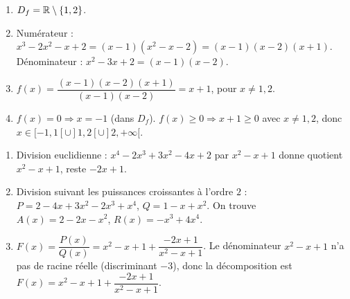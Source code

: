 \begin{enumerate}[label=\arabic*)]
    \item $D_f = \mathbb{R} \setminus \{1, 2\}$.
    \item Numérateur : $x^3 - 2x^2 - x + 2 = (x-1)(x^2 - x - 2) = (x-1)(x-2)(x+1)$. Dénominateur : $x^2 - 3x + 2 = (x-1)(x-2)$.
    \item $f(x) = \dfrac{(x-1)(x-2)(x+1)}{(x-1)(x-2)} = x+1$, pour $x \neq 1, 2$.
    \item $f(x) = 0 \Rightarrow x = -1$ (dans $D_f$). $f(x) \geq 0 \Rightarrow x+1 \geq 0$ avec $x \neq 1, 2$, donc $x \in [-1, 1[ \cup ]1, 2[ \cup ]2, +\infty[$.
\end{enumerate}

\begin{enumerate}[label=\arabic*)]
    \item Division euclidienne : $x^4 - 2x^3 + 3x^2 - 4x + 2$ par $x^2 - x + 1$ donne quotient $x^2 - x + 1$, reste $-2x + 1$.
    \item Division suivant les puissances croissantes à l'ordre $2$ : $P = 2 - 4x + 3x^2 - 2x^3 + x^4$, $Q = 1 - x + x^2$. On trouve $A(x) = 2 - 2x - x^2$, $R(x) = -x^3 + 4x^4$.
    \item $F(x) = \dfrac{P(x)}{Q(x)} = x^2 - x + 1 + \dfrac{-2x+1}{x^2 - x + 1}$. Le dénominateur $x^2 - x + 1$ n'a pas de racine réelle (discriminant $-3$), donc la décomposition est $F(x) = x^2 - x + 1 + \dfrac{-2x+1}{x^2 - x + 1}$.
\end{enumerate}
